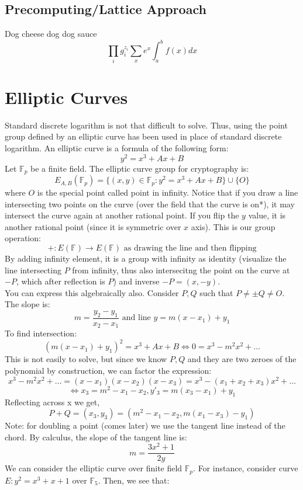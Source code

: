 \documentclass{article}
\begin{document}
\subsection{Precomputing/Lattice Approach}
Dog cheese dog dog sauce
$$\prod_i g_i^{z_i} \sum_x e^{x} \int_a^b f(x) dx$$

\section{Elliptic Curves}
Standard discrete logarithm is not that difficult to solve. Thus, using the point group defined by an elliptic curve has been used in place of standard discrete logarithm. An elliptic curve is a formula of the following form:
$$y^2 = x^3 + Ax + B$$
Let $\mathbb{F}_p$ be a finite field. The elliptic curve group for cryptography is:
$$E_{A,B}(\mathbb{F}_p) = \{ (x,y) \in \mathbb{F}_p : y^2 = x^3 + Ax + B\} \cup \{ O\}$$
where $O$ is the special point called point in infinity.
Notice that if you draw a line intersecting two points on the curve (over the field that the curve is on*), it may intersect the curve again at another rational point. If you flip the $y$ value, it is another rational point (since it is symmetric over $x$ axis). This is our group operation: 
$$+: E(\mathbb{F}) \to E(\mathbb{F})\text{ as drawing the line and then flipping}$$ 
By adding infinity element, it is a group with infinity as identity (visualize the line intersecting $P$ from infinity, thus also intersecitng the point on the curve at $-P$, which after reflection is $P$) and inverse $-P = (x,-y)$. \\
You can express this algebraically also. Consider $P,Q$ such that $P \neq \pm Q \neq O$. The slope is:
$$m = \frac{y_2 - y_1}{x_2 - x_1} \text{ and line } y = m(x-x_1) + y_1$$
To find intersection:
$$(m(x-x_1) + y_1)^2 = x^3 + Ax + B \iff 0 = x^3 - m^2 x^2 + \dots$$
This is not easily to solve, but since we know $P,Q$ and they are two zeroes of the polynomial by construction, we can factor the expression:
$$x^3 - m^2 x^2 + \dots = (x-x_1)(x-x_2)(x-x_3) = x^3 - (x_1 + x_2 + x_3)x^2 + \dots$$
$$\iff x_3 = m^2 - x_1 - x_2, y'_3 = m(x_3 -x_1) + y_1$$
Reflecting across x we get,
$$P + Q = (x_3, y_3) = (m^2 - x_1 - x_2, m(x_1 - x_3)-y_1)$$
Note: for doubling a point (comes later) we use the tangent line instead of the chord. By calculus, the slope of the tangent line is:
$$m = \frac{3x^2 + 1}{2y}$$
We can consider the elliptic curve over finite field $\mathbb{F}_p$. For instance, consider curve $E: y^2 = x^3 + x + 1$ over $\mathbb{F}_5$. Then, we see that:
\end{document}
